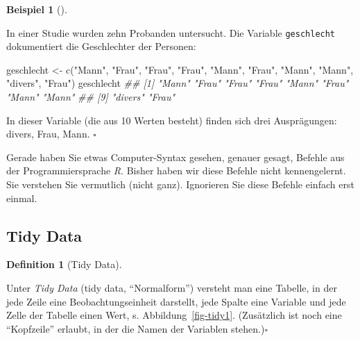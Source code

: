\documentclass[
  letterpaper,
  oneside,
  open=any]{scrbook}
\newenvironment{Shaded}{\begin{snugshade}}{\end{snugshade}}
\newcommand{\DocumentationTok}[1]{\textcolor[rgb]{0.37,0.37,0.37}{\textit{#1}}}
\newcommand{\FunctionTok}[1]{\textcolor[rgb]{0.28,0.35,0.67}{#1}}
\newcommand{\NormalTok}[1]{\textcolor[rgb]{0.00,0.23,0.31}{#1}}
\newcommand{\OtherTok}[1]{\textcolor[rgb]{0.00,0.23,0.31}{#1}}
\newcommand{\StringTok}[1]{\textcolor[rgb]{0.13,0.47,0.30}{#1}}
\theoremstyle{definition}
\theoremstyle{definition}
\newtheorem{example}{Beispiel}[chapter]
\theoremstyle{definition}
\newtheorem{definition}{Definition}[chapter]
\theoremstyle{remark}
\begin{document}
\begin{example}[]\protect\hypertarget{exm-geschlecht}{}\label{exm-geschlecht}

In einer Studie wurden zehn Probanden untersucht. Die Variable
\texttt{geschlecht} dokumentiert die Geschlechter der Personen:

\begin{Shaded}
\begin{Highlighting}[]
\NormalTok{geschlecht }\OtherTok{\textless{}{-}} \FunctionTok{c}\NormalTok{(}\StringTok{"Mann"}\NormalTok{, }\StringTok{"Frau"}\NormalTok{, }\StringTok{"Frau"}\NormalTok{, }\StringTok{"Frau"}\NormalTok{, }\StringTok{"Mann"}\NormalTok{,}
                \StringTok{"Frau"}\NormalTok{, }\StringTok{"Mann"}\NormalTok{, }\StringTok{"Mann"}\NormalTok{, }\StringTok{"divers"}\NormalTok{, }\StringTok{"Frau"}\NormalTok{)}
\NormalTok{geschlecht}
\DocumentationTok{\#\#  [1] "Mann"   "Frau"   "Frau"   "Frau"   "Mann"   "Frau"   "Mann"   "Mann"  }
\DocumentationTok{\#\#  [9] "divers" "Frau"}
\end{Highlighting}
\end{Shaded}

In dieser Variable (die aus 10 Werten besteht) finden sich drei
Ausprägungen: divers, Frau, Mann. \(\square\)

\end{example}

\begin{tcolorbox}[enhanced jigsaw, bottomrule=.15mm, left=2mm, colbacktitle=quarto-callout-tip-color!10!white, bottomtitle=1mm, colframe=quarto-callout-tip-color-frame, coltitle=black, rightrule=.15mm, breakable, toptitle=1mm, titlerule=0mm, title=\textcolor{quarto-callout-tip-color}{\faLightbulb}\hspace{0.5em}{Tipp}, opacitybacktitle=0.6, arc=.35mm, colback=white, leftrule=.75mm, opacityback=0, toprule=.15mm]

Gerade haben Sie etwas Computer-Syntax gesehen, genauer gesagt, Befehle
aus der Programmiersprache \emph{R}. Bisher haben wir diese Befehle
nicht kennengelernt. Sie verstehen Sie vermutlich (nicht ganz).
Ignorieren Sie diese Befehle einfach erst einmal.

\end{tcolorbox}

\subsection{Tidy Data}\label{tidy-data}

\begin{definition}[Tidy
Data]\protect\hypertarget{def-tidy}{}\label{def-tidy}

Unter \emph{Tidy Data} (tidy data, \enquote{Normalform}) versteht man
eine Tabelle, in der jede Zeile eine Beobachtungseinheit darstellt, jede
Spalte eine Variable und jede Zelle der Tabelle einen Wert, s.
Abbildung~\ref{fig-tidy1}. (Zusätzlich ist noch eine \enquote{Kopfzeile}
erlaubt, in der die Namen der Variablen stehen.)\(\square\)

\end{definition}
\end{document}
